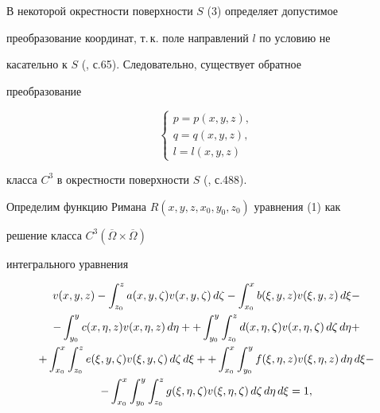 В некоторой окрестности поверхности $S$ (3) определяет допустимое


преобразование координат, т.\,к. поле направлений $l$ по условию не


касательно к $S$ (\cite{So}, с.65). Следовательно, существует обратное


преобразование


$$


\begin{cases}


p=p(x,y,z),\\


q=q(x,y,z),\\


l=l(x,y,z)


\end{cases}


$$


класса $C^{3}$ в окрестности поверхности $S$ (\cite{Zo1}, с.488).





Определим функцию Римана $R(x,y,z,x_{0},y_{0},z_{0})$ уравнения (1) как


решение класса $C^{3}(\overline{\Omega} \times \overline{\Omega} )$


интегрального уравнения


\begin{gather}


v(x,y,z)-\int_{z_{0}}^{z} a(x,y,\zeta )v(x,y,\zeta )\, d\zeta


-\int_{x_{0}}^{x} b(\xi ,y,z)v(\xi ,y,z)\, d\xi -\notag\\


%


-\int_{y_{0}}^{y} c(x,\eta ,z)v(x,\eta,z)\, d\eta +


+\int_{y_{0}}^{y} \int_{z_{0}}^{z} d(x,\eta ,\zeta )v(x,\eta ,\zeta)\, d\zeta \, d\eta+\notag\\


%


+\int_{x_{0}}^{x} \int_{z_{0}}^{z} e(\xi ,y,\zeta )v(\xi ,y,\zeta )\,d\zeta \, d\xi +


+\int_{x_{0}}^{x} \int_{y_{0}}^{y} f(\xi ,\eta ,z)v(\xi ,\eta ,z)\, d\eta \, d\xi-\notag\\


%


-\int_{x_{0}}^{x} \int_{y_{0}}^{y} \int_{z_{0}}^{z} g(\xi ,\eta ,\zeta )v(\xi ,\eta


,\zeta )\, d\zeta \, d\eta \, d\xi =1,


\end{gather}


